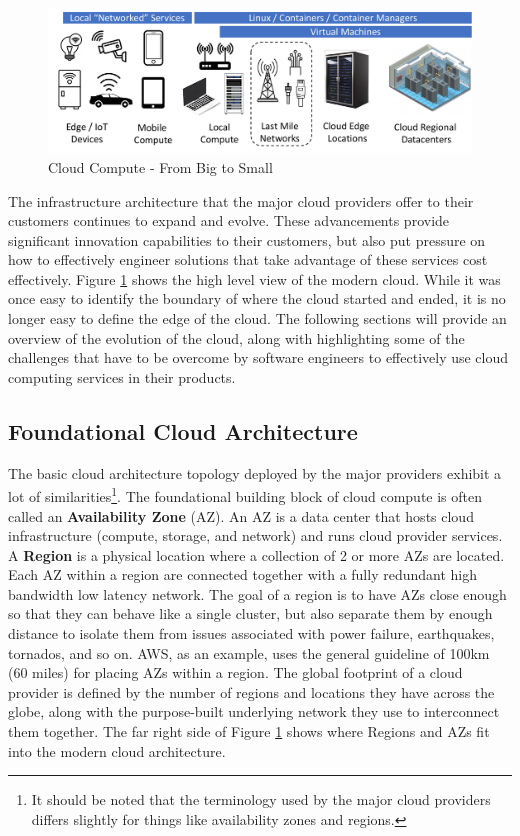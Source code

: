 \documentclass[conference]{IEEEconf}
\begin{document}
\begin{figure}[t!]
	\includegraphics[width=\textwidth]{images/CloudTopo2.pdf}	
	\caption{Cloud Compute - From Big to Small}
	\label{fig:CloudTopo}
\end{figure}

The infrastructure architecture that the major cloud providers offer to their customers continues to expand and evolve.  These advancements provide significant innovation capabilities to their customers, but also put pressure on how to effectively engineer solutions that take advantage of these services cost effectively.  Figure \ref{fig:CloudTopo} shows the high level view of the modern cloud.  While it was once easy to identify the boundary of where the cloud started and ended, it is no longer easy to define the edge of the cloud.  The following sections will provide an overview of the evolution of the cloud, along with highlighting some of the challenges that have to be overcome by software engineers to effectively use cloud computing services in their products.

\subsection{Foundational Cloud Architecture}

The basic cloud architecture topology deployed by the major providers exhibit a lot of similarities\footnote{It should be noted that the terminology used by the major cloud providers differs slightly for things like availability zones and regions.}.  The foundational building block of cloud compute is often called an \textbf{Availability Zone} (AZ).  An AZ is a data center that hosts cloud infrastructure (compute, storage, and network) and runs cloud provider services.  A \textbf{Region} is a physical location where a collection of 2 or more AZs are located.  Each AZ within a region are connected together with a fully redundant high bandwidth low latency network.  The goal of a region is to have AZs close enough so that they can behave like a single cluster, but also separate them by enough distance to isolate them from issues associated with power failure, earthquakes, tornados, and so on.  AWS, as an example, uses the general guideline of 100km (60 miles)\cite{AWS-AZ} for placing AZs within a region. The global footprint of a cloud provider is defined by the number of regions and locations they have across the globe, along with the purpose-built underlying network they use to interconnect them together. The far right side of Figure \ref{fig:CloudTopo} shows where Regions and AZs fit into the modern cloud architecture.
\end{document}
